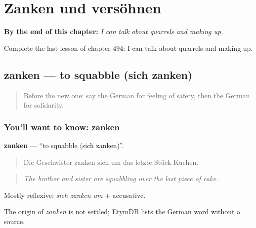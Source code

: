 
\chapter{Zanken und versöhnen}
\label{ch:ge-zanken-und-versohnen}

\begin{chapteropening}
\textbf{By the end of this chapter:} \emph{I can talk about quarrels and making up.}

Complete the last lesson of chapter 494: I can talk about quarrels and making up.
\end{chapteropening}

\section[zanken]{zanken — to squabble (sich zanken)}

\label{lesson:GE-C494-zanken}



\begin{quote}
Before the new one: say the German for feeling of safety, then the German for solidarity.
\end{quote}

\subsection*{You'll want to know: zanken}
\textbf{zanken} — \textquotedblleft{}to squabble (sich zanken)\textquotedblright{}.

\begin{quote}
Die Geschwister zanken sich um das letzte Stück Kuchen.
\end{quote}

\begin{quote}
\emph{The brother and sister are squabbling over the last piece of cake.}
\end{quote}

Mostly reflexive: \emph{sich zanken um} + accusative.

\begin{cousinweb}
The origin of \emph{zanken} is not settled; EtymDB lists the German word without a source.
\end{cousinweb}

